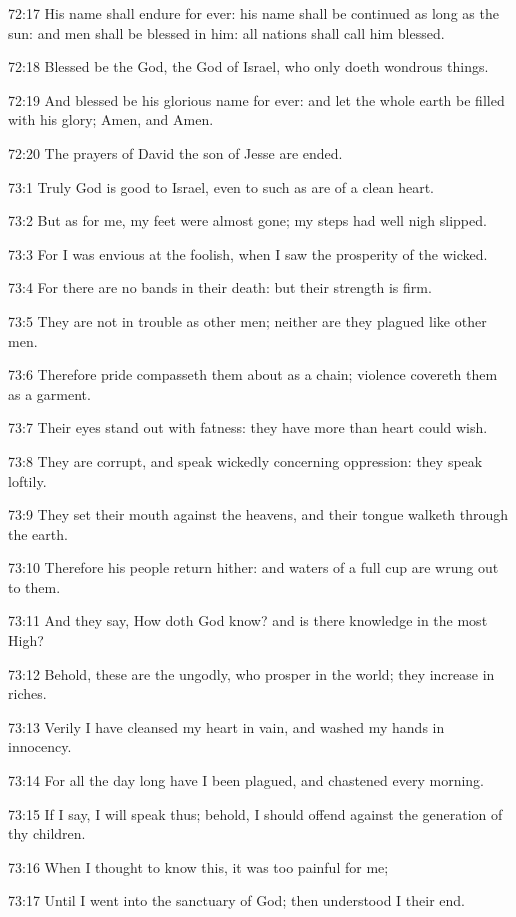 72:17 His name shall endure for ever: his name shall be continued as
long as the sun: and men shall be blessed in him: all nations shall
call him blessed.

72:18 Blessed be the \LORD God, the God of Israel, who only doeth
wondrous things.

72:19 And blessed be his glorious name for ever: and let the whole
earth be filled with his glory; Amen, and Amen.

72:20 The prayers of David the son of Jesse are ended.



73:1 Truly God is good to Israel, even to such as are of a clean
heart.

73:2 But as for me, my feet were almost gone; my steps had well nigh
slipped.

73:3 For I was envious at the foolish, when I saw the prosperity of
the wicked.

73:4 For there are no bands in their death: but their strength is
firm.

73:5 They are not in trouble as other men; neither are they plagued
like other men.

73:6 Therefore pride compasseth them about as a chain; violence
covereth them as a garment.

73:7 Their eyes stand out with fatness: they have more than heart
could wish.

73:8 They are corrupt, and speak wickedly concerning oppression: they
speak loftily.

73:9 They set their mouth against the heavens, and their tongue
walketh through the earth.

73:10 Therefore his people return hither: and waters of a full cup are
wrung out to them.

73:11 And they say, How doth God know? and is there knowledge in the
most High?

73:12 Behold, these are the ungodly, who prosper in the world; they
increase in riches.

73:13 Verily I have cleansed my heart in vain, and washed my hands in
innocency.

73:14 For all the day long have I been plagued, and chastened every
morning.

73:15 If I say, I will speak thus; behold, I should offend against the
generation of thy children.

73:16 When I thought to know this, it was too painful for me;

73:17 Until I went into the sanctuary of God; then understood I their
end.

